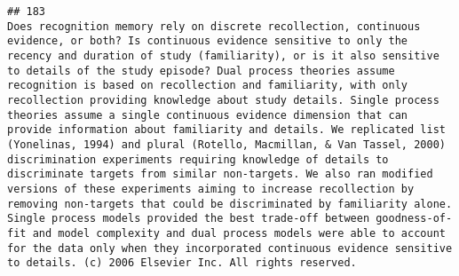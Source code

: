 \documentclass[
  english,
  man]{apa6}
\begin{document}
\begin{verbatim}
## 183                                                                                                                                                                                                                                                                                                                                                                                                                                                                                                                                                                                                                                                                                                                                                                                                                                                                                                                                                                                                                                                                                                                                                                                                                                                                                                                                                                                                                                                                                                Does recognition memory rely on discrete recollection, continuous evidence, or both? Is continuous evidence sensitive to only the recency and duration of study (familiarity), or is it also sensitive to details of the study episode? Dual process theories assume recognition is based on recollection and familiarity, with only recollection providing knowledge about study details. Single process theories assume a single continuous evidence dimension that can provide information about familiarity and details. We replicated list (Yonelinas, 1994) and plural (Rotello, Macmillan, & Van Tassel, 2000) discrimination experiments requiring knowledge of details to discriminate targets from similar non-targets. We also ran modified versions of these experiments aiming to increase recollection by removing non-targets that could be discriminated by familiarity alone. Single process models provided the best trade-off between goodness-of-fit and model complexity and dual process models were able to account for the data only when they incorporated continuous evidence sensitive to details. (c) 2006 Elsevier Inc. All rights reserved.

\end{verbatim}
\end{document}
